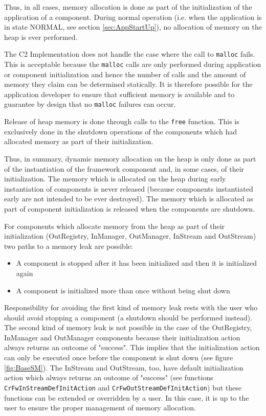\documentclass{pnp_article}
\begin{document}
Thus, in all cases, memory allocation is done as part of the initialization of the application of a component. During normal operation (i.e. when the application is in state NORMAL, see section \ref{sec:AppStartUp}), no allocation of memory on the heap is ever performed.

The C2 Implementation does not handle the case where the call to \texttt{malloc} fails.  This is acceptable because the \texttt{malloc} calls are only performed during application or component initialization and hence the number of calls and the amount of memory they claim can be determined statically. It is therefore possible for the application developer to ensure that sufficient memory is available and to guarantee by design that no \texttt{malloc} failures can occur.

Release of heap memory is done through calls to the \texttt{free} function. This is exclusively done in the shutdown operations of the components which had allocated memory as part of their initialization. 

Thus, in summary, dynamic memory allocation on the heap is only done as part of the instantiation of the framework component and, in some cases, of their initialization. The memory which is allocated on the heap during early instantiation of components is never released (because components instantiated early are not intended to be ever destroyed). The memory which is allocated as part of component initialization is released when the components are shutdown.

For components which allocate memory from the heap as part of their initialization (OutRegistry, InManager, OutManager, InStream and OutStream) two paths to a memory leak are possible:

\begin{itemize}
\item A component is stopped after it has been initialized and then it is initialized again
\item A component is initialized more than once without being shut down
\end{itemize}

Responsibility for avoiding the first kind of memory leak rests with the user who should avoid stopping a component (a shutdown should be performed instead). The second kind of memory leak is not possible in the case of the OutRegistry, InManager and OutManager components because their initialization action always returns an outcome of "success". This implies that the initialization action can only be executed once before the component is shut down (see figure \ref{fig:BaseSM}). The InStream and OutStream, too, have default initialization action which always returns an outcome of "success" (see functions \texttt{CrFwInStreamDefInitAction} and \texttt{CrFwOutStreamDefInitAction}) but these functions can be extended or overridden by a user. In this case, it is up to the user to ensure the proper management of memory allocation. 
\end{document}
